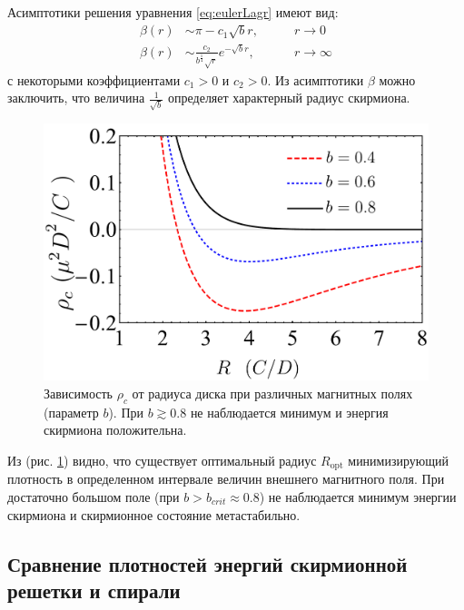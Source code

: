 \documentclass[a4paper,article,14pt]{extarticle}
\begin{document}
Асимптотики решения уравнения \eqref{eq:eulerLagr} имеют вид:
\begin{eqnarray*}
\label{eq:asympt_beta}
\beta(r) &\sim \pi - c_1 \sqrt{b} r ,\qquad &r \rightarrow 0 \\
\beta(r) &\sim \frac{c_2}{b^{\frac{1}{4}}\sqrt{r}} e^{-\sqrt{b} r} ,\qquad & r \rightarrow \infty
\end{eqnarray*}
с некоторыми коэффициентами $c_1>0$ и $c_2>0$. Из асимптотики $\beta$ можно заключить, что величина $\frac{1}{\sqrt{b}}$ определяет характерный радиус скирмиона.

\begin{figure}[t]
\centering\includegraphics[width=0.65\paperwidth]{images/plotDensity.pdf}
\caption{Зависимость $\rho _c$ от радиуса диска при различных магнитных полях (параметр $b$). При $b\gtrsim 0.8$ не наблюдается минимум и энергия скирмиона положительна.}
\label{pic:plotDensity}
\end{figure}
Из (рис. \ref{pic:plotDensity}) видно, что существует оптимальный радиус $R_{\text{opt}}$ минимизирующий плотность в определенном интервале величин внешнего магнитного поля. При достаточно большом поле (при $b > b_{crit} \approx 0.8$) не наблюдается минимум энергии скирмиона и скирмионное состояние метастабильно.

\subsection{ Сравнение плотностей энергий скирмионной решетки и спирали }
\end{document}
